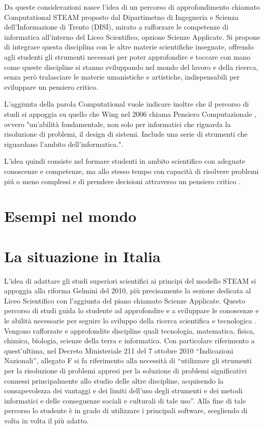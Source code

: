 Da queste considerazioni nasce l’idea di un percorso di approfondimento chiamato Computational STEAM proposto dal Dipartimetno di Ingegneria e Scienza dell'Informazione di Trento (DISI), mirato a rafforzare le competenze di informatica all’interno del Liceo Scientifico, opzione Scienze Applicate. Si propone di integrare questa disciplina con le altre materie scientifiche insegnate, offrendo agli studenti gli strumenti necessari per poter approfondire e toccare con mano come queste discipline si stanno sviluppando nel mondo del lavoro e della ricerca, senza però tralasciare le materie umanistiche e artistiche, indispensabili per sviluppare un pensiero critico.

L'aggiunta della parola Computational vuole indicare inoltre che il percorso di studi si appoggia su quello che Wing nel 2006 chiama Pensiero Computazionale \cite{wing}, ovvero "un'abilità fondamentale, non solo per informatici che riguarda la risoluzione di problemi, il design di sistemi. Include una serie di strumenti che riguardano l'ambito dell'informatica.". 

L'idea quindi consiste nel formare studenti in ambito scientifico con adeguate conoscenze e competenze, ma allo stesso tempo con capacità di risolvere problemi piú o meno complessi e di prendere decisioni attraverso un pensiero critico \cite{ct_to_stem}.

\section{Esempi nel mondo}


\section{La situazione in Italia}
\label{sec:italia}
L’idea di adattare gli studi superiori scientifici ai principi del modello STEAM si appoggia alla riforma Gelmini del 2010, più precisamente la sezione dedicata al Liceo Scientifico con l’aggiunta del piano chiamato Scienze Applicate. Questo percorso di studi guida lo studente ad approfondire e a sviluppare le conoscenze e le abilità necessarie per seguire lo sviluppo della ricerca scientifica e tecnologica \cite{scienze_applicate}. Vengono rafforzate e approfondite discipline quali tecnologia, matematica, fisica, chimica, biologia, scienze della terra e informatica. Con particolare riferimento a quest’ultima, nel Decreto Ministeriale 211 del 7 ottobre 2010 “Indicazioni Nazionali”, allegato F \cite{riforma} si fa riferimento alla necessità di “utilizzare gli strumenti per la risoluzione di problemi appresi per la soluzione di problemi significativi connessi principalmente allo studio delle altre discipline, acquisendo la consapevolezza dei vantaggi e dei limiti dell’uso degli strumenti e dei metodi informatici e delle conseguenze sociali e culturali di tale uso”. Alla fine di tale percorso lo studente è in grado di utilizzare i principali software, scegliendo di volta in volta il più adatto.

